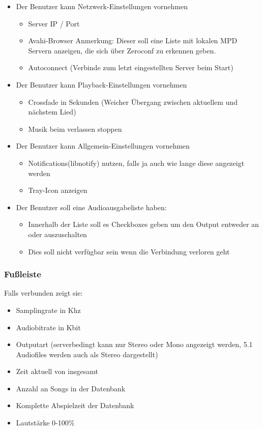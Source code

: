 \begin{itemize}
    \item Der Benutzer kann Netzwerk-Einstellungen vornehmen
        \begin{itemize}
            \item Server IP / Port
            \item Avahi-Browser
                Anmerkung: Dieser soll eine Liste mit lokalen MPD Servern anzeigen,
                die sich über Zeroconf zu erkennen geben. 
            \item Autoconnect (Verbinde zum letzt eingestellten Server beim Start)
        \end{itemize}
    \item Der Benutzer kann Playback-Einstellungen vornehmen	
        \begin{itemize}
            \item Crossfade in Sekunden (Weicher Übergang zwischen aktuellem und nächstem Lied)
            \item Musik beim verlassen stoppen
        \end{itemize}
    \item Der Benutzer kann Allgemein-Einstellungen vornehmen
        \begin{itemize}
            \item Notifications(libnotify) nutzen, falls ja auch wie lange diese angezeigt werden
            \item Tray-Icon anzeigen
        \end{itemize}
    \item Der Benutzer soll eine Audioausgabeliste haben:
        \begin{itemize}
            \item Innerhalb der Liste soll es Checkboxes geben um den Output entweder an oder auszuschalten
            \item Dies soll nicht verfügbar sein wenn die Verbindung verloren geht
        \end{itemize}
\end{itemize}

\subsubsection{Fußleiste}
Falls verbunden zeigt sie:
\begin{itemize}
    \item Samplingrate in Khz
    \item Audiobitrate in Kbit
    \item Outputart (serverbedingt kann nur Stereo oder Mono angezeigt werden, 5.1 Audiofiles werden auch als Stereo dargestellt)
    \item Zeit aktuell von insgesamt
    \item Anzahl an Songs in der Datenbank
    \item Komplette Abspielzeit der Datenbank
    \item Lautstärke 0-100\%
\end{itemize}
